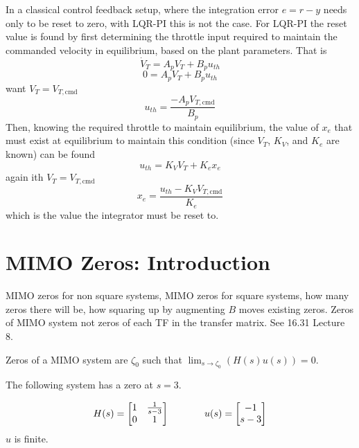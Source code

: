 In a classical control feedback setup, where the integration error $e=r-y$ needs only to be reset to zero, with LQR-PI this is not the case.
For LQR-PI the reset value is found by first determining the throttle input required to maintain the commanded velocity in equilibrium, based on the plant parameters.
That is
\begin{equation*}
  \dot{V}_{T}=A_{p}V_{T}+B_{p}u_{th}
\end{equation*}
\begin{equation*}
  0=A_{p}V_{T}+B_{p}u_{th}
\end{equation*}
want $V_{T}=V_{T,\text{cmd}}$
\begin{equation*}
  u_{th}=\frac{-A_{p}V_{T,\text{cmd}}}{B_{p}}
\end{equation*}
Then, knowing the required throttle to maintain equilibrium, the value of $x_{e}$ that must exist at equilibrium to maintain this condition (since $V_{T}$, $K_{V}$, and $K_{e}$ are known) can be found
\begin{equation*}
  u_{th}=K_{V}V_{T}+K_{e}x_{e}
\end{equation*}
again ith $V_{T}=V_{T,\text{cmd}}$
\begin{equation*}
  x_{e}=\frac{u_{th}-K_{V}V_{T,\text{cmd}}}{K_{e}}
\end{equation*}
which is the value the integrator must be reset to.

\section{MIMO Zeros: Introduction}

MIMO zeros for non square systems, MIMO zeros for square systems, how many zeros there will be, how squaring up by augmenting $B$ moves existing zeros.
Zeros of MIMO system not zeros of each TF in the transfer matrix.
See 16.31 Lecture 8.

\begin{defn-dan}
  Zeros of a MIMO system are $\zeta_{0}$ such that $\lim_{s\rightarrow\zeta_{0}}\left(H(s)u(s)\right)=0$.
\end{defn-dan}

\begin{example}
  The following system has a zero at $s=3$.

  \begin{equation*}
    H(s)=
    \begin{bmatrix}
      1 & \frac{1}{s-3} \\
      0 & 1
    \end{bmatrix}
    \hspace{0.5in}
    u(s)=
    \begin{bmatrix}
      -1 \\
      s-3
    \end{bmatrix}
  \end{equation*}
  $u$ is finite.
\end{example}

